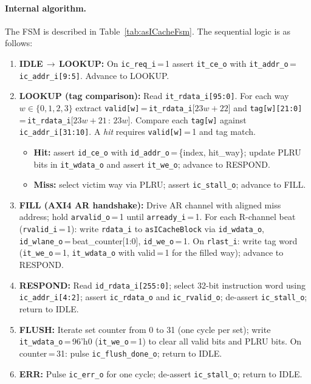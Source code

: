 \paragraph{Internal algorithm.}
The FSM is described in Table~\ref{tab:asICacheFsm}.
The sequential logic is as follows:

\begin{enumerate}
  \item \textbf{IDLE\,$\to$\,LOOKUP:}
    On \texttt{ic\_req\_i}\,=\,1 assert \texttt{it\_ce\_o} with
    \texttt{it\_addr\_o}\,=\,\texttt{ic\_addr\_i[9:5]}.
    Advance to LOOKUP.

  \item \textbf{LOOKUP (tag comparison):}
    Read \texttt{it\_rdata\_i[95:0]}.
    For each way $w \in \{0,1,2,3\}$ extract
    \texttt{valid[w]}\,=\,\texttt{it\_rdata\_i}[$23w{+}22$] and
    \texttt{tag[w][21:0]}\,=\,\texttt{it\_rdata\_i}[$23w{+}21\,:\,23w$].
    Compare each \texttt{tag[w]} against \texttt{ic\_addr\_i[31:10]}.
    A \emph{hit} requires \texttt{valid[w]}\,=\,1 and tag match.
    \begin{itemize}
      \item \textbf{Hit:} assert \texttt{id\_ce\_o} with
        \texttt{id\_addr\_o}\,=\,\{index, hit\_way\};
        update PLRU bits in \texttt{it\_wdata\_o} and assert
        \texttt{it\_we\_o}; advance to RESPOND.
      \item \textbf{Miss:} select victim way via PLRU;
        assert \texttt{ic\_stall\_o}; advance to FILL.
    \end{itemize}

  \item \textbf{FILL (AXI4 AR handshake):}
    Drive AR channel with aligned miss address;
    hold \texttt{arvalid\_o}\,=\,1 until \texttt{arready\_i}\,=\,1.
    For each R-channel beat (\texttt{rvalid\_i}\,=\,1):
    write \texttt{rdata\_i} to \texttt{asICacheBlock} via
    \texttt{id\_wdata\_o}, \texttt{id\_wlane\_o}\,=\,beat\_counter[1:0],
    \texttt{id\_we\_o}\,=\,1.
    On \texttt{rlast\_i}: write tag word (\texttt{it\_we\_o}\,=\,1,
    \texttt{it\_wdata\_o} with valid\,=\,1 for the filled way);
    advance to RESPOND.

  \item \textbf{RESPOND:}
    Read \texttt{id\_rdata\_i[255:0]};
    select 32-bit instruction word using \texttt{ic\_addr\_i[4:2]};
    assert \texttt{ic\_rdata\_o} and \texttt{ic\_rvalid\_o};
    de-assert \texttt{ic\_stall\_o}; return to IDLE.

  \item \textbf{FLUSH:}
    Iterate set counter from 0 to 31 (one cycle per set);
    write \texttt{it\_wdata\_o}\,=\,96'h0 (\texttt{it\_we\_o}\,=\,1)
    to clear all valid bits and PLRU bits.
    On counter\,=\,31: pulse \texttt{ic\_flush\_done\_o}; return to IDLE.

  \item \textbf{ERR:}
    Pulse \texttt{ic\_err\_o} for one cycle; de-assert
    \texttt{ic\_stall\_o}; return to IDLE.
\end{enumerate}

